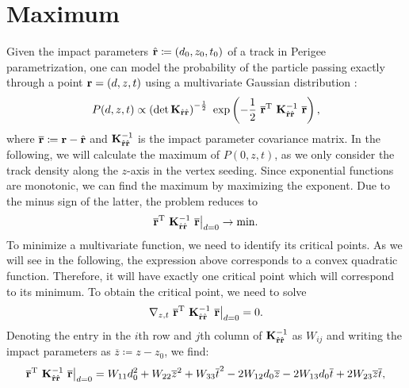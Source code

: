 \documentclass[12pt,a4paper]{scrarticle}
\begin{document}
\maketitle

\begin{abstract}
    
\end{abstract}

\tableofcontents

 \section{Maximum}
Given the impact parameters $\hat{\mathbf{r}} \coloneqq (d_0, z_0, t_0)$ of a track in Perigee parametrization, one can model the probability of the particle passing exactly through a point $\mathbf{r} = (d, z, t)$ using a multivariate Gaussian distribution \cite{multivariate-gaussian}:
\begin{align*}
    P(d, z, t) \propto \left(\det \CovMat{\ip}\right)^{-\frac{1}{2}}\ \exp{- \frac{1}{2} \ \ipCoordShifted^{\transpose} \ \CovMat{\ip}^{-1} \ \ipCoordShifted},
\end{align*}
%
where $\overline{\mathbf{r}} \coloneq \mathbf{r} - \hat{\mathbf{r}}$ and $\mathbf{K}_{\hat{\mathbf{r}} \hat{\mathbf{r}}}^{-1}$ is the impact parameter covariance matrix. In the following, we will calculate the maximum of $P(0, z, t)$, as we only consider the track density along the $z$-axis in the vertex seeding. Since exponential functions are monotonic, we can find the maximum by maximizing the exponent. Due to the minus sign of the latter, the problem reduces to 
\begin{align}
\label{eq:target}
    \overline{\mathbf{r}}^{\mathrm{T}} \ \mathbf{K}_{\hat{\mathbf{r}} \hat{\mathbf{r}}}^{-1} \ \overline{\mathbf{r}} \big|_{d = 0}\rightarrow \text{min}.
\end{align}
%
To minimize a multivariate function, we need to identify its critical points. As we will see in the following, the expression above corresponds to a convex quadratic function. Therefore, it will have exactly one critical point which will correspond to its minimum. To obtain the critical point, we need to solve
\begin{align*}
    \grad_{z, t} \ \ipCoordShifted^{\transpose} \ \CovMat{\ip}^{-1} \ \ipCoordShifted \big|_{d = 0} = 0.
\end{align*}
%
Denoting the entry in the $i$th row and $j$th column of $\mathbf{K}_{\hat{\mathbf{r}} \hat{\mathbf{r}}}^{-1}$ as $W_{ij}$ and writing the impact parameters as $\overline{z} \coloneq z - z_0$, we find:
\begin{align*}
    \overline{\mathbf{r}}^{\mathrm{T}} \ \mathbf{K}_{\hat{\mathbf{r}} \hat{\mathbf{r}}}^{-1} \ \overline{\mathbf{r}} \big|_{d = 0} = W_{11} d_0^2 + W_{22} \overline{z}^2 + W_{33} \overline{t}^2 - 2 W_{12} d_0 \overline{z} - 2 W_{13} d_0 \overline{t} + 2 W_{23}  \overline{z} \overline{t},
\end{align*}
\end{document}
